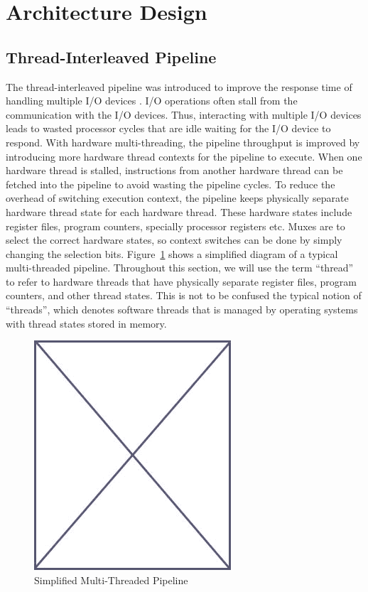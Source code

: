 \section{Architecture Design} 
\subsection{Thread-Interleaved Pipeline}
\label{subsection:pret_thread_pipeline}
The thread-interleaved pipeline was introduced to improve the response time of handling multiple I/O devices .
I/O operations often stall from the communication with the I/O devices.
Thus, interacting with multiple I/O devices leads to wasted processor cycles that are idle waiting for the I/O device to respond.
With hardware multi-threading, the pipeline throughput is improved by introducing more hardware thread contexts for the pipeline to execute. 
When one hardware thread is stalled, instructions from another hardware thread can be fetched into the pipeline to avoid wasting the pipeline cycles. 
To reduce the overhead of switching execution context, the pipeline keeps physically separate hardware thread state for each hardware thread. 
These hardware states include register files, program counters, specially processor registers etc. 
Muxes are to select the correct hardware states, so context switches can be done by simply changing the selection bits. 
Figure~\ref{fig:multi-thread pipeline simplified} shows a simplified diagram of a typical multi-threaded pipeline.    
Throughout this section, we will use the term ``thread'' to refer to hardware threads that have physically separate register files, program counters, and other thread states.
This is not to be confused the typical notion of ``threads'', which denotes software threads that is managed by operating systems with thread states stored in memory.  
\begin{figure}
\begin{center}
\includegraphics[scale=.4]{figs/placeholder}
\end{center}
\caption{Simplified Multi-Threaded Pipeline}
\label{fig:multi-thread pipeline simplified}
\end{figure}
